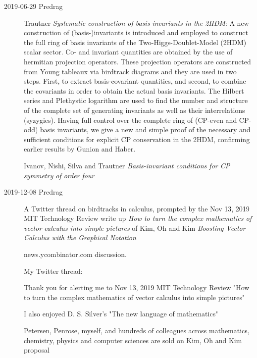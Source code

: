 \begin{description}
\item[2019-06-29 Predrag]
Trautner
{\em Systematic construction of basis invariants in the {2HDM}}:
A new construction of (basis-)invariants is introduced and
employed to construct the full ring of basis invariants of the
Two-Higgs-Doublet-Model (2HDM) scalar sector. Co- and invariant
quantities are obtained by the use of hermitian projection operators.
These projection operators are constructed from Young tableaux via
birdtrack diagrams and they are used in two steps. First, to extract
basis-covariant quantities, and second, to combine the covariants in
order to obtain the actual basis invariants. The Hilbert series and
Plethystic logarithm are used to find the number and structure of the
complete set of generating invariants as well as their interrelations
(syzygies). Having full control over the complete ring of (CP-even and
CP-odd) basis invariants, we give a new and simple proof of the necessary
and sufficient conditions for explicit CP conservation in the 2HDM,
confirming earlier results by Gunion and Haber.

Ivanov, Nishi, Silva and Trautner
{\em Basis-invariant conditions for {CP} symmetry of order four}

\item[2019-12-08 Predrag]
A 
{Twitter thread} on birdtracks in calculus, prompted by
the Nov 13, 2019 MIT Technology Review
{write up}
{\em How to turn the complex mathematics of vector calculus into simple pictures}
of Kim, Oh and Kim
{\em Boosting Vector Calculus with the Graphical Notation} 

{news.ycombinator.com} discussion.

My Twitter thread:

Thank you for alerting me to Nov 13, 2019 MIT Technology Review "How to
turn the complex mathematics of vector calculus into simple pictures"

I also enjoyed D. S. Silver's "The new language of mathematics"

Petersen, Penrose, myself, and hundreds of colleagues across mathematics, chemistry, physics and computer sciences are sold on Kim, Oh and Kim proposal


\end{description}
